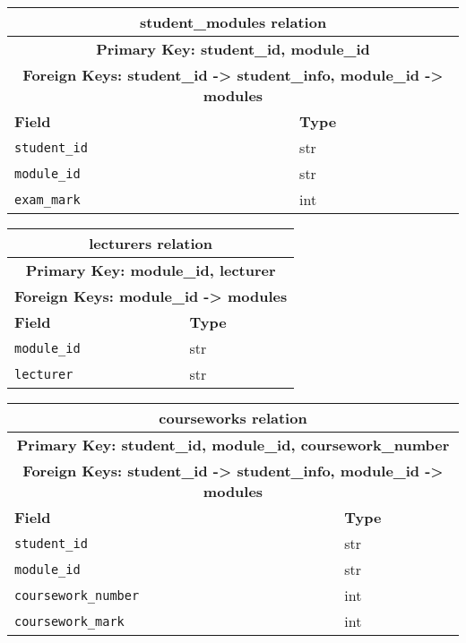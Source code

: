 \documentclass{article}
\begin{document}
\begin{table}[H]
    \centering
    \begin{tabularx}{\textwidth}{|X|X|} 
    \hline
    \multicolumn{2}{|c|}{\textbf{student\_modules relation}} \\
        \hline
    \multicolumn{2}{|c|}{\textbf{Primary Key: student\_id, module\_id}} \\
    \hline
    \multicolumn{2}{|c|}{\textbf{Foreign Keys: student\_id -> student\_info,  module\_id -> modules}} \\
    \hline
        \textbf{Field} & \textbf{Type} \\
        \hline
        \verb|student_id| & str \\
        \hline
        \verb|module_id| & str \\
        \hline
        \verb|exam_mark| & int \\
        \hline
    \end{tabularx}
\end{table}



\begin{table}[H]
    \centering
    \begin{tabularx}{\textwidth}{|X|X|} %
    \hline
    \multicolumn{2}{|c|}{\textbf{lecturers relation}} \\
        \hline
    \multicolumn{2}{|c|}{\textbf{Primary Key: module\_id, lecturer}} \\
    \hline
    \multicolumn{2}{|c|}{\textbf{Foreign Keys: module\_id -> modules}} \\
    \hline
        \textbf{Field} & \textbf{Type} \\
        \hline
        \verb|module_id| & str \\
        \hline
        \verb|lecturer| & str \\
        \hline
    \end{tabularx}
\end{table}

\begin{table}[H]
    \centering
    \begin{tabularx}{\textwidth}{|X|X|} %
    \hline
    \multicolumn{2}{|c|}{\textbf{courseworks relation}} \\
        \hline
    \multicolumn{2}{|c|}{\textbf{Primary Key: student\_id, module\_id, coursework\_number}} \\
    \hline
    \multicolumn{2}{|c|}{\textbf{Foreign Keys: student\_id -> student\_info,  module\_id -> modules}} \\
    \hline
        \textbf{Field} & \textbf{Type} \\
        \hline
        \verb|student_id| & str \\
        \hline
        \verb|module_id| & str \\
        \hline
        \verb|coursework_number| & int \\
        \hline
        \verb|coursework_mark| & int \\
        \hline
    \end{tabularx}
\end{table}
\end{document}
